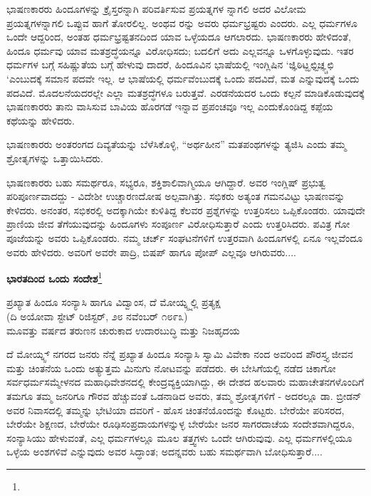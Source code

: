 ಭಾಷಣಕಾರರು ಹಿಂದೂಗಳನ್ನು ಕ್ರೈಸ್ತರನ್ನಾಗಿ ಪರಿವರ್ತಿಸುವ ಪ್ರಯತ್ನಗಳ ನ್ನಾಗಲಿ ಅದರ ವಿಲೋಮ ಪ್ರಯತ್ನಗಳನ್ನಾಗಲಿ ಒಪ್ಪುವ ಹಾಗೆ ತೋರಲಿಲ್ಲ. ಅಂಥವ ರನ್ನು ಅವರು ಧರ್ಮಭ್ರಷ್ಟರು ಎಂದರು. ಎಲ್ಲ ಧರ್ಮಗಳೂ ಒಂದೇ ಆದ್ದರಿಂದ, ಅಂತಹ ಧರ್ಮಭ್ರಷ್ಟತನದಿಂದ ಯಾವ ಒಳ್ಳೆಯದೂ ಆಗಲಾರದು. ಭಾಷಣಕಾರರು ಹೇಳಿದಂತೆ, ಹಿಂದೂ ಧರ್ಮವು ಯಾವ ಮತಶ್ರದ್ಧೆಯನ್ನೂ ವಿರೋಧಿಸದು; ಬದಲಿಗೆ ಅದು ಎಲ್ಲವನ್ನೂ ಒಳಗೊಳ್ಳುವುದು. ಇತರ ಧರ್ಮಗಳ ಬಗ್ಗೆ ಸಹಿಷ್ಣುತೆಯ ಬಗ್ಗೆ ಹೇಳುವು ದಾದರೆ, ಹಿಂದೂವಿನ ಭಾಷೆಯಲ್ಲಿ ಇಂಗ್ಲಿಷಿನ ‘ಜ್ಞಿಠಿಟ್ಝಛ್ಟಿಚ್ಞ್ಚಛಿ ‘ಎಂಬುದಕ್ಕೆ ಸಮಾನ ಪದವೇ ಇಲ್ಲ. ಆ ಭಾಷೆಯಲ್ಲಿ ಧರ್ಮವೆಂಬುದಕ್ಕೆ ಒಂದು ಪದವಿದೆ, ಮತ ಎನ್ನುವುದಕ್ಕೆ ಒಂದು ಪದವಿದೆ. ಮೊದಲನೆಯದರಲ್ಲೇ ಎಲ್ಲಾ ಮತಶ್ರದ್ಧೆಗಳೂ ಬರುತ್ತವೆ. ಎರಡನೆಯದರ ಒಂದು ಕಲ್ಪನೆ ಮಾಡಿಕೊಡುವುದಕ್ಕೆ ಭಾಷಣಕಾರರು ತಾನು ವಾಸಿಸುವ ಬಾವಿಯ ಹೊರಗಡೆ ಇನ್ನಾವ ಪ್ರಪಂಚವೂ ಇಲ್ಲ ಎಂದುಕೊಂಡಿದ್ದ ಕಪ್ಪೆಯ ಕಥೆಯನ್ನು ಹೇಳಿದರು.

ಭಾಷಣಕಾರರು ಅಂತರಂಗದ ದಿವ್ಯತೆಯನ್ನು ಬೆಳೆಸಿಕೊಳ್ಳಿ, “ಅರ್ಥಹೀನ” ಮತಪಂಥಗಳನ್ನು ತ್ಯಜಿಸಿ ಎಂದು ತಮ್ಮ ಶ್ರೋತೃಗಳನ್ನು ಒತ್ತಾಯಿಸಿದರು.

ಭಾಷಣಕಾರರು ಬಹು ಸಮರ್ಥರೂ, ಸಭ್ಯರೂ, ಶಕ್ತಿಶಾಲಿವಾಗ್ಮಿಯೂ ಆಗಿದ್ದಾರೆ. ಅವರ ಇಂಗ್ಲಿಷ್ ಪ್ರಭುತ್ವ ಪರಿಪೂರ್ಣವಾದದ್ದು - ವಿದೇಶೀ ಉಚ್ಚಾರಣದೋಷ ಅಲ್ಪವಾಗಿತ್ತು. ಸಭಿಕರು ಅತ್ಯಂತ ಗಮನವಿಟ್ಟು ಭಾಷಣವನ್ನು ಕೇಳಿದರು. ಅನಂತರ, ಸಭಿಕರಲ್ಲಿ ಅದಕ್ಕಾಗಿಯೇ ಕುಳಿತಿದ್ದ ಕೆಲವರ ಪ್ರಶ್ನೆಗಳನ್ನು ಉತ್ತರಿಸಲು ಒಪ್ಪಿಕೊಂಡರು. ಯಾವುದೇ ಪ್ರಾಣಿಯ ಜೀವ ತೆಗೆಯುವುದನ್ನು ಹಿಂದೂಗಳು ಸಂಪೂರ್ಣ ವಿರೋಧಿಸುತ್ತಾರೆ ಎಂದು ಉತ್ತರಿಸಿದರು. ಪವಿತ್ರ ಗೋ ಪೂಜೆಯನ್ನು ಅವರು ಒಪ್ಪಿಕೊಂಡರು. ನಮ್ಮ ಚರ್ಚ್ ಸಂಘಟನೆಗಳಿಗೆ ಉತ್ತರವಾಗಿ ಹಿಂದೂಗಳಲ್ಲಿ ಏನೂ ಇಲ್ಲವೆಂದೂ ಅವರು ಹೇಳಿದರು. ಅವರಿಗೆ ಅವರೇ ಪಾದ್ರಿ, ಬಿಷಪ್ ಹಾಗೂ ಪೋಪ್ ಎಲ್ಲವೂ ಆಗಿರುವರು....

\begin{center}
\textbf{ಭಾರತದಿಂದ ಒಂದು ಸಂದೇಶ}\footnote{}
\end{center}

\begin{center}
ಪ್ರಖ್ಯಾತ ಹಿಂದೂ ಸಂನ್ಯಾಸಿ ಹಾಗೂ ವಿದ್ವಾಂಸ, ದೆ ಮೋಯ್ನ್ಸ್ನಲ್ಲಿ ಪ್ರತ್ಯಕ್ಷ \\(ದಿ ಅಯೋವಾ ಸ್ಟೇಟ್ ರಿಜಿಸ್ಟರ್, ೨೮ ನವೆಂಬರ್ ೧೮೯೩)\\ಮೂವತ್ತು ವರ್ಷದ ತರುಣನ ಚುರುಕಾದ ಉದಾರಬುದ್ಧಿ ಮತ್ತು ನಿಜಹೃದಯ
\end{center}

ದೆ ಮೋಯ್ನ್ಸ್ ನಗರದ ಜನರು ನೆನ್ನೆ ಪ್ರಖ್ಯಾತ ಹಿಂದೂ ಸಂನ್ಯಾಸಿ ಸ್ವಾಮಿ ವಿವೇಕಾ ನಂದ ಅವರಿಂದ ಪೌರಸ್ತ್ಯ ಜೀವನ ಮತ್ತು ಚಿಂತನೆಯ ಒಂದು ಅತ್ಯುತ್ತಮ ಮಿನುಗು ನೋಟವನ್ನು ಪಡೆದರು. ಈ ಬೇಸಿಗೆಯಲ್ಲಿ ನಡೆದ ಚಿಕಾಗೋ ಸರ್ವಧರ್ಮಸಮ್ಮೇಳನದ ಮಹಾಧಿವೇಶನದಲ್ಲಿ ಕೇಂದ್ರವ್ಯಕ್ತಿಯಾಗಿದ್ದು, ಈ ದೇಶದ ಹಲವಾರು ಮಹಾಚೇತನಗಳೊಂದಿಗೆ ತಮಗೂ ತಮ್ಮ ಜನರಿಗೂ ಗೌರವ ಹೆಚ್ಚುವಂತೆ ಒಡನಾಡಿದ ಅವರು, ತಮ್ಮ ಶ್ರೋತೃಗಳಿಗೆ - ಅದರಲ್ಲೂ ಡಾ. ಬ್ರೀಡನ್ ಅವರ ನಿವಾಸದಲ್ಲಿ ತಮ್ಮನ್ನು ಭೇಟಿಯಾ ದವರಿಗೆ - ಹೊಸ ಚಿಂತನೆಯೊಂದನ್ನು ಕೊಟ್ಟರು. ಬೇರೆಯೇ ಪರಿಸರದ, ಬೇರೆಯೇ ಶಿಕ್ಷಣದ, ಬೇರೆಯೇ ರೂಢಿಸಂಪ್ರದಾಯಗಳನ್ನುಳ್ಳ ಬೇರೆಯೇ ಜನರ ಸಾಗರದಾಚೆಯ ಸಂದೇಶವಾಗಿದ್ದರೂ, ಸಂನ್ಯಾಸಿಯು ಹೇಳುವಂತೆ, ಎಲ್ಲ ಧರ್ಮಗಳಲ್ಲೂ ಮೂಲ ತತ್ತ್ವಗಳು ಒಂದೇ ಆಗಿರುವುವು. ಎಲ್ಲ ಧರ್ಮಗಳಲ್ಲಿಯೂ ಒಳ್ಳೆಯ ಅಂಶಗಳಿವೆ ಎನ್ನುವುದು ಅವರ ಸಿದ್ಧಾಂತ; ಅದನ್ನವರು ಬಹು ಸಮರ್ಥವಾಗಿ ಬೋಧಿಸುತ್ತಾರೆ....

